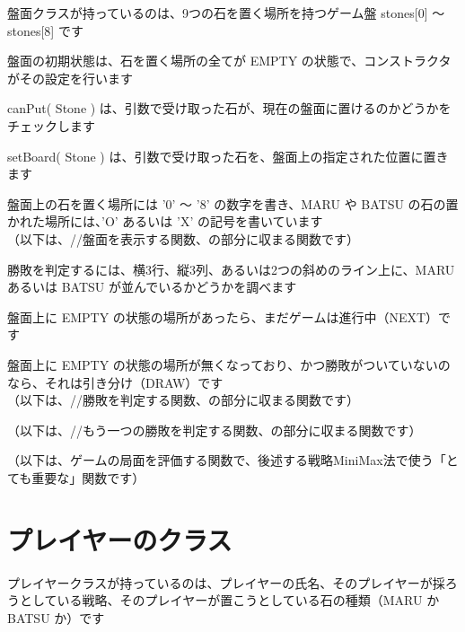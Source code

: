 \documentclass[uplatex,a4paper,11pt,oneside,openany]{jsbook}
\begin{document}
盤面クラスが持っているのは、9つの石を置く場所を持つゲーム盤 stones[0] 〜 stones[8] です

盤面の初期状態は、石を置く場所の全てが EMPTY の状態で、コンストラクタがその設定を行います

canPut( Stone ) は、引数で受け取った石が、現在の盤面に置けるのかどうかをチェックします

setBoard( Stone ) は、引数で受け取った石を、盤面上の指定された位置に置きます



盤面上の石を置く場所には '0' 〜 '8' の数字を書き、MARU や BATSU の石の置かれた場所には、'O' あるいは 'X' の記号を書いています\\

（以下は、//盤面を表示する関数、の部分に収まる関数です）



勝敗を判定するには、横3行、縦3列、あるいは2つの斜めのライン上に、MARU あるいは BATSU が並んでいるかどうかを調べます

盤面上に EMPTY の状態の場所があったら、まだゲームは進行中（NEXT）です

盤面上に EMPTY の状態の場所が無くなっており、かつ勝敗がついていないのなら、それは引き分け（DRAW）です\\

（以下は、//勝敗を判定する関数、の部分に収まる関数です）



（以下は、//もう一つの勝敗を判定する関数、の部分に収まる関数です）



（以下は、ゲームの局面を評価する関数で、後述する戦略MiniMax法で使う「とても重要な」関数です）



\section{プレイヤーのクラス}

プレイヤークラスが持っているのは、プレイヤーの氏名、そのプレイヤーが採ろうとしている戦略、そのプレイヤーが置こうとしている石の種類（MARU か BATSU か）です
\end{document}

